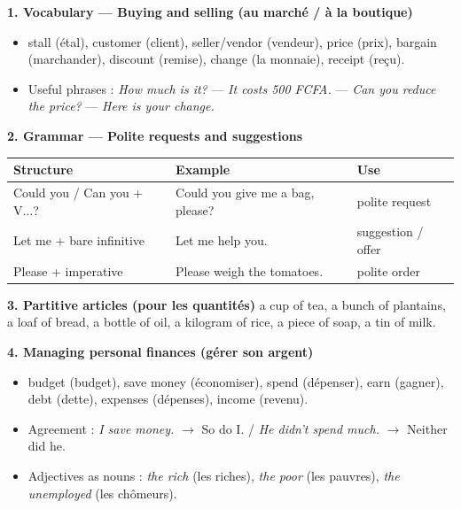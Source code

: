 \documentclass[11pt]{article}
\newcommand{\cle}[1]{{\popxbold\color{popdark}#1}}
\begin{document}
\begin{bilan}
\textbf{1. Vocabulary — Buying and selling (au marché / à la boutique)}
\begin{itemize}
\item \cle{stall} (étal), \cle{customer} (client), \cle{seller/vendor} (vendeur), \cle{price} (prix), \cle{bargain} (marchander), \cle{discount} (remise), \cle{change} (la monnaie), \cle{receipt} (reçu).
\item Useful phrases : \emph{How much is it?} — \emph{It costs 500 FCFA.} — \emph{Can you reduce the price?} — \emph{Here is your change.}
\end{itemize}

\textbf{2. Grammar — Polite requests and suggestions}
\begin{center}
\begin{tabularx}{\linewidth}{|l|X|X|}\hline
\rowcolor{popblueL} \textbf{Structure} & \textbf{Example} & \textbf{Use} \\ \hline
Could you / Can you + V...? & Could you give me a bag, please? & polite request \\ \hline
Let me + bare infinitive & Let me help you. & suggestion / offer \\ \hline
Please + imperative & Please weigh the tomatoes. & polite order \\ \hline
\end{tabularx}
\end{center}

\textbf{3. Partitive articles (pour les quantités)}
a \cle{cup} of tea, a \cle{bunch} of plantains, a \cle{loaf} of bread, a \cle{bottle} of oil, a \cle{kilogram} of rice, a \cle{piece} of soap, a \cle{tin} of milk.

\textbf{4. Managing personal finances (gérer son argent)}
\begin{itemize}
\item \cle{budget} (budget), \cle{save money} (économiser), \cle{spend} (dépenser), \cle{earn} (gagner), \cle{debt} (dette), \cle{expenses} (dépenses), \cle{income} (revenu).
\item Agreement : \emph{I save money.} $\rightarrow$ \cle{So do I}. / \emph{He didn't spend much.} $\rightarrow$ \cle{Neither did he}.
\item Adjectives as nouns : \emph{the rich} (les riches), \emph{the poor} (les pauvres), \emph{the unemployed} (les chômeurs).
\end{itemize}


\end{bilan}
\end{document}
